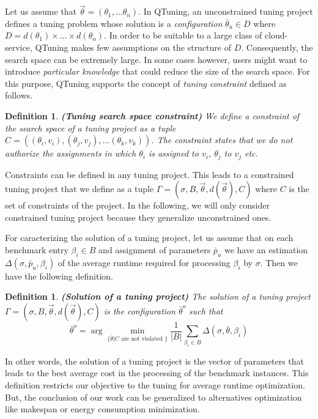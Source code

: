 \documentclass[10pt, conference, compsocconf]{IEEEtran}
\newtheorem{definition}[theorem]{Definition}
\begin{document}
Let us assume that $\vec{\theta} = (\theta_1,\dots \theta_n)$. In QTuning, an unconstrained tuning project defines 
a tuning problem whose solution is a {\it configuration} $\bar{\theta}_u \in D$ where $D = d(\theta_1) \times \dots  \times d(\theta_n)$. 
In order to be suitable to a large class of cloud-service, QTuning makes few assumptions on the structure of $D$. 
Consequently, the search space can be extremely large. 
In some cases however, users might want to introduce {\it particular knowledge} that could reduce the size of the search space. 
For this purpose, QTuning supports the concept of {\it tuning constraint} defined as follows.

\begin{definition}{\bf (Tuning search space constraint)}
We define a constraint of the search space of a tuning project as a tuple $C = ((\theta_i, v_i), (\theta_j, v_j),\dots (\theta_k, v_k))$. 
The constraint states that we do not authorize the assignments in which $\theta_i$ is assigned to $v_i$, $\theta_j$ to $v_j$ etc.
\end{definition}


Constraints can be defined in any tuning project. This leads to a constrained tuning project that we define 
 as a tuple $ \Gamma = (\sigma, B, \vec{\theta}, d(\vec{\theta}), C)$ where $C$ is the set of constraints of the project. 
In the following, we will only consider constrained tuning project because they generalize unconstrained ones. 


For caracterizing the solution of a tuning project, let us assume that on each benchmark entry $\beta_i \in B$ 
and assignment of parameters $\bar{p}_u$ we have an estimation $\Delta(\sigma, \bar{p}_u, \beta_i)$ of the 
average runtime required for processing $\beta_i$ by $\sigma$. Then we have the following definition.

\begin{definition}{\bf (Solution of a tuning project)}
The solution of a tuning project $ \Gamma = (\sigma, B, \vec{\theta}, d(\vec{\theta}), C)$  is the configuration 
$\bar{\theta}^o$ such that \[ \bar{\theta}^o = \arg \underset{\{\bar{\theta} | C \text{ are not violated }\}}{\min} \frac{1}{|B|}\sum_{\beta_i \in B} \Delta(\sigma, \bar{\theta}, \beta_i) \] 
\end{definition}

In other words, the solution of a tuning project is the vector of parameters that leads to the best average 
cost in the processing of the benchmark instances. This definition restricts our objective to the tuning for average runtime 
optimization. But, the conclusion of our work can be generalized to alternatives optimization like makespan or energy 
consumption minimization.  
\end{document}
